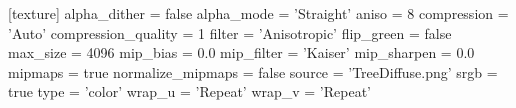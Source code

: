 [texture]
alpha_dither = false
alpha_mode = 'Straight'
aniso = 8
compression = 'Auto'
compression_quality = 1
filter = 'Anisotropic'
flip_green = false
max_size = 4096
mip_bias = 0.0
mip_filter = 'Kaiser'
mip_sharpen = 0.0
mipmaps = true
normalize_mipmaps = false
source = 'TreeDiffuse.png'
srgb = true
type = 'color'
wrap_u = 'Repeat'
wrap_v = 'Repeat'
